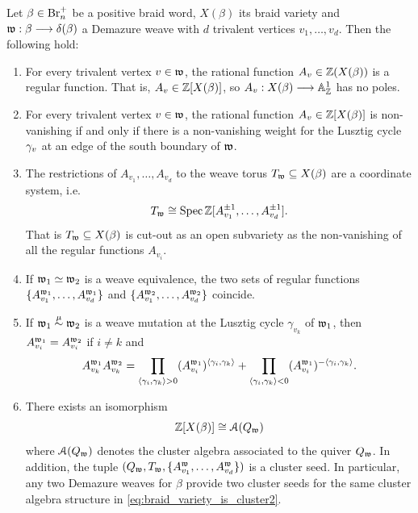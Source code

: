 \begin{fthm}\label{thm:cluster_variables_weave_intro2}
Let $\beta\in\mbox{Br}_n^+$ be a positive braid word, $X(\beta)$ its braid variety and $\mathfrak{w}:\beta\longrightarrow\delta(\beta)$ a Demazure weave with $d$ trivalent vertices $v_1,\ldots,v_d$. Then the following hold:

\begin{enumerate}[label=$(\arabic*)$]
    \item For every trivalent vertex $v\in\mathfrak{w}$, the rational function $A_v\in\mathbb{Z}(X(\beta))$ is a regular function. That is, $A_v\in\mathbb{Z}[X(\beta)]$, so $A_v:X(\beta)\longrightarrow\mathbb{A}^1_{\mathbb{Z}}$ has no poles.\\

    \item For every trivalent vertex $v\in\mathfrak{w}$, the rational function $A_v\in\mathbb{Z}[X(\beta)]$ is non-vanishing if and only if there is a non-vanishing weight for the Lusztig cycle $\gamma_v$ at an edge of the south boundary of $\mathfrak{w}$.\\

    \item The restrictions of $A_{v_1},\ldots,A_{v_d}$ to the weave torus $T_{\mathfrak{w}}\subseteq X(\beta)$ are a coordinate system, i.e.~
    $$T_{\mathfrak{w}}\cong \operatorname{Spec}\mathbb{Z}[A_{v_1}^{\pm1},\ldots,A_{v_d}^{\pm1}].$$
    That is $T_{\mathfrak{w}}\subseteq X(\beta)$ is cut-out as an open subvariety as the non-vanishing of all the regular functions $A_{v_i}$.\\

    \item If $\mathfrak{w}_1\simeq\mathfrak{w}_2$ is a weave equivalence, the two sets of regular functions $\{A^{\mathfrak{w}_1}_{v_1},\ldots,A^{\mathfrak{w}_1}_{v_d}\}$ and $\{A^{\mathfrak{w}_2}_{v_1},\ldots,A^{\mathfrak{w}_2}_{v_d}\}$ coincide.\\

    \item If $\mathfrak{w}_1\stackrel{\mu}{\sim}\mathfrak{w}_2$ is a weave mutation at the Lusztig cycle $\gamma_{v_k}$ of $\mathfrak{w}_1$, then $A^{\mathfrak{w}_1}_{v_i}=A^{\mathfrak{w}_2}_{v_i}$ if $i\neq k$ and
    \begin{equation}\label{eq:cluster_mutation_weave_variables}
        \displaystyle A^{\mathfrak{w}_1}_{v_k}A^{\mathfrak{w}_2}_{v_k}=\prod_{\langle \gamma_i,\gamma_k\rangle>0} (A^{\mathfrak{w}_1}_{v_i})^{\langle \gamma_i,\gamma_k\rangle}+\prod_{\langle \gamma_i,\gamma_k\rangle<0} (A^{\mathfrak{w}_1}_{v_i})^{-\langle \gamma_i,\gamma_k\rangle}.
    \end{equation}

    \item There exists an isomorphism
    \begin{equation}\label{eq:braid_variety_is_cluster2}
        \mathbb{Z}[X(\beta)]\cong\mathcal{A}(Q_{\mathfrak{w}})
    \end{equation}
    where $\mathcal{A}(Q_{\mathfrak{w}})$ denotes the cluster algebra associated to the quiver $Q_{\mathfrak{w}}$. In addition, the tuple $(Q_{\mathfrak{w}},T_{\mathfrak{w}},\{A^{\mathfrak{w}}_{v_1},\ldots,A^{\mathfrak{w}}_{v_d}\})$ is a cluster seed. In particular, any two Demazure weaves for $\beta$ provide two cluster seeds for the same cluster algebra structure in \eqref{eq:braid_variety_is_cluster2}.\\
\end{enumerate}
\end{fthm}
\vspace{0.2cm}

